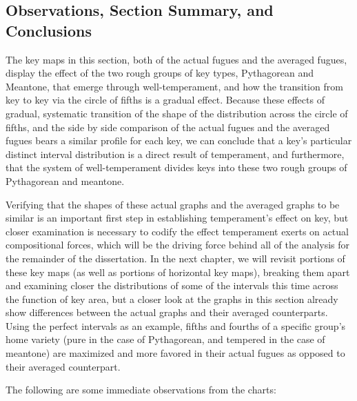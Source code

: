 \subsection{Observations, Section Summary, and
Conclusions}\label{observations-section-summary-and-conclusions}

The key maps in this section, both of the actual fugues and the averaged
fugues, display the effect of the two rough groups of key types,
Pythagorean and Meantone, that emerge through well-temperament, and how
the transition from key to key via the circle of fifths is a gradual
effect. Because these effects of gradual, systematic transition of the
shape of the distribution across the circle of fifths, and the side by
side comparison of the actual fugues and the averaged fugues bears a
similar profile for each key, we can conclude that a key's particular
distinct interval distribution is a direct result of temperament, and
furthermore, that the system of well-temperament divides keys into these
two rough groups of Pythagorean and meantone.

Verifying that the shapes of these actual graphs and the averaged graphs
to be similar is an important first step in establishing temperament's
effect on key, but closer examination is necessary to codify the effect
temperament exerts on actual compositional forces, which will be the
driving force behind all of the analysis for the remainder of the
dissertation. In the next chapter, we will revisit portions of these key
maps (as well as portions of horizontal key maps), breaking them apart
and examining closer the distributions of some of the intervals this
time across the function of key area, but a closer look at the graphs in
this section already show differences between the actual graphs and
their averaged counterparts. Using the perfect intervals as an example,
fifths and fourths of a specific group's home variety (pure in the case
of Pythagorean, and tempered in the case of meantone) are maximized and
more favored in their actual fugues as opposed to their averaged
counterpart.

The following are some immediate observations from the charts:

